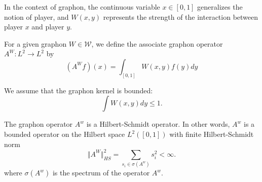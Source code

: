 \begin{remark}
 In the context of graphon, the continuous variable $x \in [0,1]$ generalizes the notion of player, and $W(x,y)$ represents the strength of the interaction between player $x$ and player $y$.
\end{remark}

\begin{definition}
	For a given graphon $W \in \mathcal{W}$, we define the associate graphon operator $A^W: L^2 \to L^2$ by
	$$
		(A^W f) (x) = \int_{[0,1]} W(x,y) f(y) dy
	$$
\end{definition}


We assume that the graphon kernel is bounded:
$$
\int W(x,y) dy \leq 1.
$$

\begin{proposition}
	 The graphon operator $A^w$ is a Hilbert-Schmidt operator. In other words, $A^w$ is a bounded operator on the Hilbert space $L^2([0,1])$ with finite Hilbert-Schmidt norm
			$$
				\Vert A^W \Vert^2_{HS} = \sum_{s_i \in \sigma(A^w)} s_i^2 < \infty.
			$$
		where $\sigma(A^w)$ is the spectrum of the operator $A^w$.
\end{proposition}


